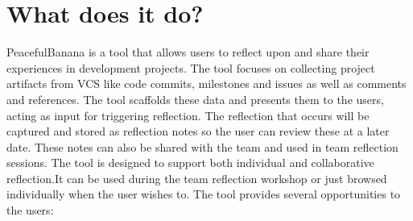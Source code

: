 \section{What does it do?}
PeacefulBanana is a tool that allows users to reflect upon and share their experiences in development projects. The tool focuses on collecting project artifacts from VCS like code commits, milestones and issues as well as comments and references. The tool scaffolds these data and presents them to the users, acting as input for triggering reflection. The reflection that occurs will be captured and stored as reflection notes so the user can review these at a later date. These notes can also be shared with the team and used in team reflection sessions. The tool is designed to support both individual and collaborative reflection.It can be used during the team reflection workshop or just browsed individually when the user wishes to. The tool provides several opportunities to the users:
